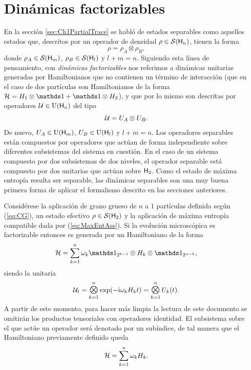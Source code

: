 \section{Dinámicas factorizables}

En la sección \ref{sec:Ch1PartialTrace} se habló de estados separables como aquellos estados que, descritos por un operador de densidad $\rho\in\mathcal{S}({\sf H}_{n})$, tienen la forma
\begin{equation*}
    \rho=\rho_{A}\otimes\rho_{B},
\end{equation*}
donde $\rho_{A}\in\mathcal{S}({\sf H}_{m})$, $\rho_{B}\in\mathcal{S}({\sf H}_{l})$ y $l+m=n$. Siguiendo esta línea de pensamiento, con \textit{dinámicas factorizables} nos referimos a dinámicas unitarias generadas por Hamiltonianos que no contienen un término de interacción (que en el caso de dos partículas son Hamiltonianos de la forma $\mcH=H_{1}\otimes\Id+\Id\otimes H_{2}$), y que por lo mismo son descritas por operadores $\mathcal{U}\in\text{U}({\sf H}_{n})$ del tipo
\begin{equation*}
    \mathcal{U}=U_{A}\otimes U_{B}.
\end{equation*}
De nuevo, $U_{A}\in\text{U}({\sf H}_{m})$, $U_{B}\in\text{U}({\sf H}_{l})$ y $l+m=n$. Los operadores separables están compuestos por operadores que actúan de forma independiente sobre diferentes subsistemas del sistema en cuestión. En el caso de un sistema compuesto por dos subsistemas de dos niveles, el operador separable está compuesto por dos unitarias que actúan sobre ${\sf H}_{2}$. Como el estado de máxima entropía resulta ser separable, las dinámicas separables son una muy buena primera forma de aplicar el formalismo descrito en las secciones anteriores.

Considérese la aplicación de grano grueso de $n$ a $1$ partículas definida según (\ref{eq:CG}), un estado efectivo $\rho\in\mathcal{S}({\sf H}_{2})$ y la aplicación de máxima entropía compatible dada por (\ref{eq:MaxEntAss}). Si la evolución microscópica es factorizable entonces es generada por un Hamiltoniano de la forma
\begin{equation*}
    \mcH=\sum_{k=1}^{n}\omega_{k}\Id_{2^{k-1}}\otimes H_{k} \otimes \Id_{2^{n-k}},
\end{equation*}
siendo la unitaria 
\begin{equation}\label{eq:NFactorUnitaries}
    \mcU_{t}=\Motimes_{k=1}^{n}\text{exp}\qty(-\rmi\omega_{k}H_{k}t)=\Motimes_{k=1}^{n} U_{k}(t).
\end{equation}
A partir de este momento, para hacer más limpia la lectura de este documento se omitirán los productos tensoriales con operadores identidad. El subsistema sobre el que actúe un operador será denotado por un subíndice, de tal manera que el Hamiltoniano previamente definido queda
\begin{equation*}
    \mathcal{H}=\sum_{k=1}^{n}\omega_{k}H_{k}.
\end{equation*}


